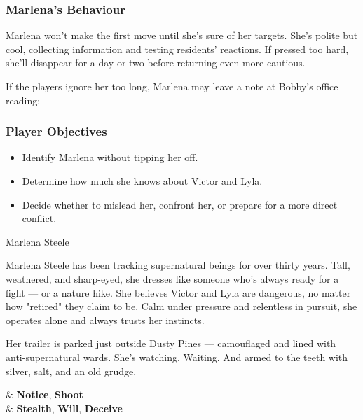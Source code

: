 \begin{multicols}{2}
\subsubsection*{Marlena’s Behaviour}
Marlena won’t make the first move until she’s sure of her targets. She’s polite but cool, collecting information and testing residents’ reactions. If pressed too hard, she’ll disappear for a day or two before returning even more cautious.

If the players ignore her too long, Marlena may leave a note at Bobby’s office reading:  
\begin{center}
\end{center}

\subsubsection*{Player Objectives}
\begin{itemize}
    \item Identify Marlena without tipping her off.
    \item Determine how much she knows about Victor and Lyla.
    \item Decide whether to mislead her, confront her, or prepare for a more direct conflict.
\end{itemize}

\begin{NPC}[description={Hunter, Focused, Not Easily Fooled}]{Marlena Steele}

    Marlena Steele has been tracking supernatural beings for over thirty years. Tall, weathered, and sharp-eyed, she dresses like someone who’s always ready for a fight — or a nature hike. She believes Victor and Lyla are dangerous, no matter how "retired" they claim to be. Calm under pressure and relentless in pursuit, she operates alone and always trusts her instincts.

    Her trailer is parked just outside Dusty Pines — camouflaged and lined with anti-supernatural wards. She’s watching. Waiting. And armed to the teeth with silver, salt, and an old grudge.

    \vspace{0.5\baselineskip}
    \begin{SkillsBox}
        \Skilled & \textbf{Notice}, \textbf{Shoot} \\
        \Novice  & \textbf{Stealth}, \textbf{Will}, \textbf{Deceive}
    \end{SkillsBox}


\end{NPC}
\end{multicols}
